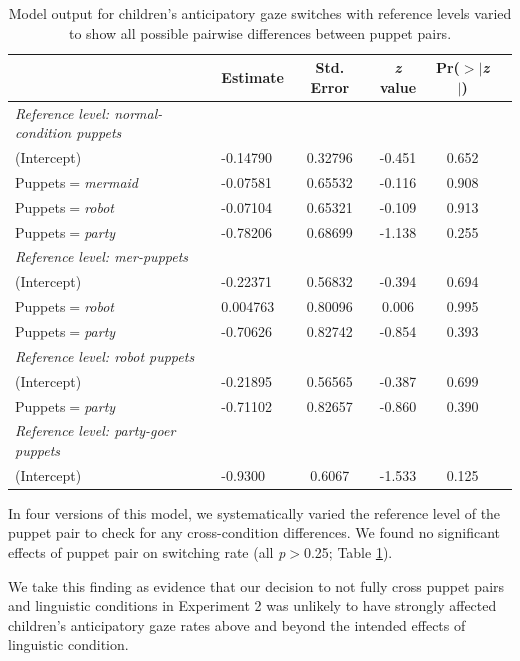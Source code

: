 \documentclass[authoryear, 12pt]{elsarticle}
\begin{document}
\linespread{1}
\begin{table}
\begin{center}
  \begin{tabular}{llcccc}
           &  Estimate & Std. Error & \textit{z} value & Pr($>$$|$\textit{z}$|$) \\    
    \hline
		 \footnotesize{\textit{Reference level: normal-condition puppets}} &&&& \\
    \hline
     (Intercept) 								& -0.14790	& 0.32796	& -0.451		& 0.652 \\ 
     Puppets$=$\textit{mermaid} 	& -0.07581	& 0.65532	& -0.116		& 0.908 \\ 
     Puppets$=$\textit{robot} 		& -0.07104	& 0.65321	& -0.109		& 0.913 \\ 
     Puppets$=$\textit{party} 		& -0.78206	& 0.68699	& -1.138		& 0.255 \\ 
    \hline
		 \footnotesize{\textit{Reference level: mer-puppets}} &&&& \\
    \hline
     (Intercept) 								& -0.22371	& 0.56832	& -0.394		& 0.694 \\ 
     Puppets$=$\textit{robot} 		& 0.004763	& 0.80096	& 0.006		& 0.995 \\ 
     Puppets$=$\textit{party} 		& -0.70626	& 0.82742	& -0.854		& 0.393 \\ 
    \hline
		 \footnotesize{\textit{Reference level: robot puppets}} &&&& \\
    \hline
     (Intercept) 								& -0.21895	& 0.56565	& -0.387		& 0.699 \\ 
     Puppets$=$\textit{party} 		& -0.71102	& 0.82657	& -0.860		& 0.390 \\ 
    \hline
		 \footnotesize{\textit{Reference level: party-goer puppets}} &&&& \\
    \hline
     (Intercept) 								& -0.9300	& 0.6067		& -1.533		& 0.125 \\ 
  \end{tabular}
\end{center}
  \caption{Model output for children's anticipatory gaze switches with reference levels varied to show all possible pairwise differences between puppet pairs.}
\label{tab:control_exp}
\end{table}
\linespread{2}

In four versions of this model, we systematically varied the reference level of the puppet pair to check for any cross-condition differences. We found no significant effects of puppet pair on switching rate (all \textit{p}$>$0.25; Table \ref{tab:control_exp}).

We take this finding as evidence that our decision to not fully cross puppet pairs and linguistic conditions in Experiment 2 was unlikely to have strongly affected children's anticipatory gaze rates above and beyond the intended effects of linguistic condition.
\end{document}
